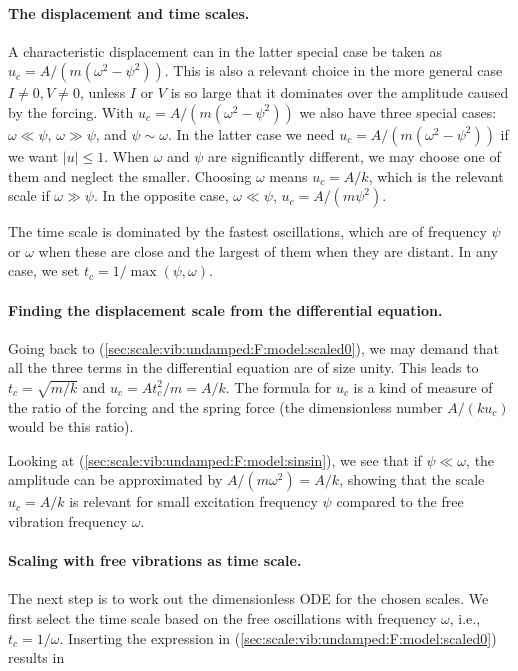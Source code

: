 \documentclass[graybox,envcountchap,sectrefs,final]{svmonodo}
\begin{document}
\paragraph{The displacement and time scales.}
A characteristic displacement can in the latter special case
be taken as $u_c= A/(m(\omega^2 - \psi^2))$. This is also a relevant choice
in the more general case $I\neq0, V\neq 0$, unless $I$ or $V$
is so large that it dominates over the amplitude
caused by the forcing. With $u_c= A/(m(\omega^2 - \psi^2))$ we also
have three special cases: $\omega \ll \psi$, $\omega \gg\psi$, and
$\psi \sim \omega$. In the latter case we need
$u_c= A/(m(\omega^2 - \psi^2))$ if we want $|u|\leq 1$. When
$\omega$ and $\psi$ are significantly different, we may choose one
of them and neglect the smaller. Choosing $\omega$ means $u_c=A/k$,
which is the relevant scale
if $\omega\gg\psi$. In the opposite case, $\omega\ll\psi$,
$u_c=A/(m\psi^2)$.

The time scale is dominated by the fastest oscillations, which are
of frequency $\psi$ or $\omega$ when these are close and the largest
of them when they are distant. In any case, we set
$t_c=1/\max(\psi,\omega)$.

\paragraph{Finding the displacement scale from the differential equation.}
Going back to (\ref{sec:scale:vib:undamped:F:model:scaled0}), we
may demand that all the three terms in the differential equation
are of size unity. This leads to $t_c=\sqrt{m/k}$
and $u_c=At_c^2/m = A/k$. The formula for $u_c$ is a kind of measure
of the ratio of the
forcing and the spring force (the dimensionless number
$A/(ku_c)$ would be this ratio).

Looking at (\ref{sec:scale:vib:undamped:F:model:sinsin}), we see
that if $\psi\ll\omega$, the amplitude can be approximated
by $A/(m\omega^2)=A/k$, showing that the scale $u_c=A/k$ is
relevant for small excitation frequency $\psi$ compared to
the free vibration frequency $\omega$.

\paragraph{Scaling with free vibrations as time scale.}
The next step is to work out the dimensionless ODE for the chosen scales.
We first select the time scale based on the free oscillations
with frequency $\omega$, i.e., $t_c=1/\omega$. Inserting the expression in
(\ref{sec:scale:vib:undamped:F:model:scaled0}) results in
\end{document}
